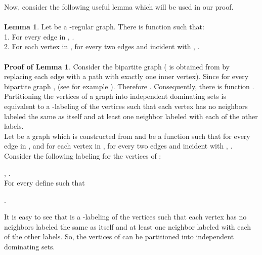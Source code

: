 \documentclass[
final
]{dmtcs-episciences}
\begin{document}
Now, consider the following useful lemma which will be used in our proof.
\\ \\
{\bf Lemma 1}. Let  be a -regular graph. There is function  such that:\\
1. For every edge  in , .\\
2. For each vertex  in , for every two edges  and  incident with , .
\\ \\
{\bf Proof of Lemma 1}. Consider the bipartite graph  ( is obtained from  by replacing each edge with a path with
exactly one inner vertex).   Since for every bipartite  graph ,  (see for example \cite{MR1367739}). Therefore . Consequently, there is function . 
\\

Partitioning the vertices of a graph into  independent dominating sets is equivalent to a -labeling of the vertices such that each vertex has no neighbors labeled the same as itself and at least one neighbor labeled with each of the other  labels.\\
Let  be a graph which is constructed from  and  be a function  such that for every edge  in ,  and for each vertex  in , for every two edges  and  incident with , .
Consider the following  labeling for the vertices of  :

, .
\\
For every  define  such that

.

It is easy to see that  is a -labeling of the vertices such that each vertex has no neighbors labeled the same as itself and at least one neighbor labeled with each of the other  labels. So, the vertices of  can be partitioned  into  independent dominating sets. 



\end{document}

